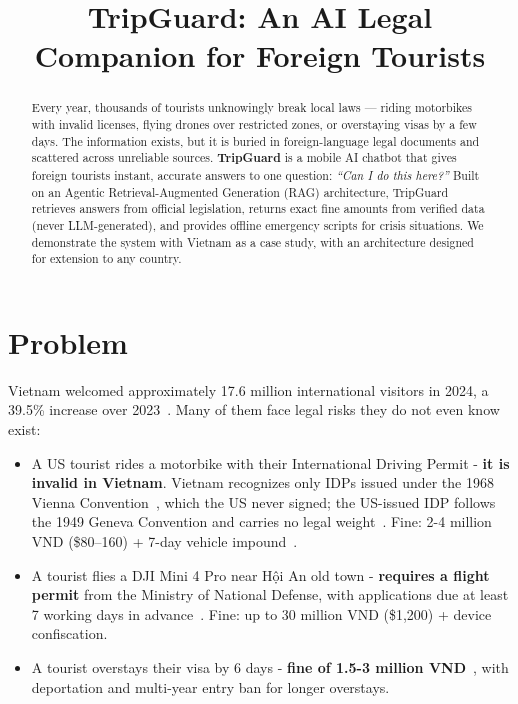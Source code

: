 \documentclass[conference, onecolumn]{IEEEtran}
\begin{document}
\title{TripGuard: An AI Legal Companion for Foreign Tourists}

\author{
}

\maketitle

\begin{abstract}
Every year, thousands of tourists unknowingly break local laws — riding motorbikes with invalid licenses, flying drones over restricted zones, or overstaying visas by a few days. The information exists, but it is buried in foreign-language legal documents and scattered across unreliable sources. \textbf{TripGuard} is a mobile AI chatbot that gives foreign tourists instant, accurate answers to one question: \textit{``Can I do this here?''} Built on an Agentic Retrieval-Augmented Generation (RAG) architecture, TripGuard retrieves answers from official legislation, returns exact fine amounts from verified data (never LLM-generated), and provides offline emergency scripts for crisis situations. We demonstrate the system with Vietnam as a case study, with an architecture designed for extension to any country.
\end{abstract}

\section{Problem}

Vietnam welcomed approximately 17.6 million international visitors in 2024, a 39.5\% increase over 2023~\cite{vnat2024}. Many of them face legal risks they do not even know exist:

\begin{itemize}[leftmargin=*]
    \item A US tourist rides a motorbike with their International Driving Permit - \textbf{it is invalid in Vietnam}. Vietnam recognizes only IDPs issued under the 1968 Vienna Convention~\cite{vienna1968}, which the US never signed; the US-issued IDP follows the 1949 Geneva Convention and carries no legal weight~\cite{tlalaw_idp}. Fine: 2-4 million VND (\$80--160) + 7-day vehicle impound~\cite{nd168}.
    \item A tourist flies a DJI Mini 4 Pro near Hội An old town - \textbf{requires a flight permit} from the Ministry of National Defense, with applications due at least 7 working days in advance~\cite{nd288}. Fine: up to 30 million VND (\$1,200) + device confiscation.
    \item A tourist overstays their visa by 6 days - \textbf{fine of 1.5-3 million VND}~\cite{nd07}, with deportation and multi-year entry ban for longer overstays.
\end{itemize}
\end{document}
